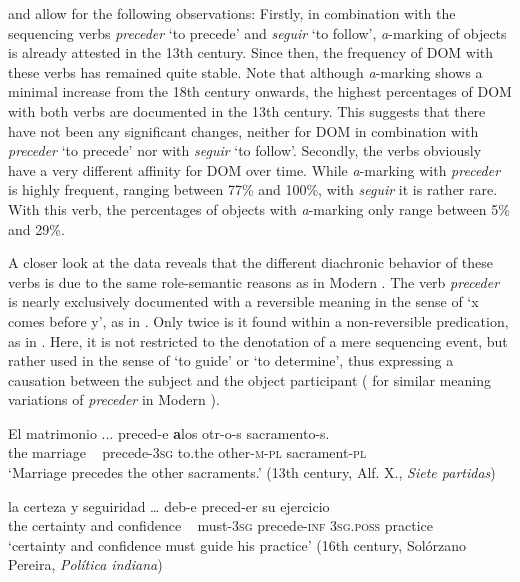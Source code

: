 \documentclass[output=paper]{LSP/langsci}
\begin{document}
 and  allow for the following observations: Firstly, in combination with the sequencing verbs \textit{preceder} ‘to precede’ and \textit{seguir} ‘to follow’, \textit{a}-marking of  objects is already attested in the 13th century. Since then, the frequency of DOM with these verbs has remained quite stable. Note that al\-though \textit{a}-marking shows a minimal increase from the 18th century onwards, the highest percentages of DOM with both verbs are documented in the 13th century. This suggests that there have not been any significant changes, neither for DOM in combination with \textit{preceder} ‘to precede’ nor with \textit{seguir} ‘to follow’. Secondly, the verbs obviously have a very different affinity for DOM over time. While \textit{a}-marking with \textit{preceder} is highly frequent, ranging between 77\% and 100\%, with \textit{seguir} it is rather rare. With this verb, the percentages of  objects with \textit{a}-marking only range between 5\% and 29\%.

A closer look at the data reveals that the different diachronic behavior of these verbs is due to the same role-semantic reasons as in Modern . The verb \textit{preceder} is nearly exclusively documented with a reversible meaning in the sense of ‘x comes before y’, as in . Only twice is it found within a non-reversible predication, as in . Here, it is not restricted to the denotation of a mere sequencing event, but rather used in the sense of ‘to guide’ or ‘to determine’, thus expressing a causation between the subject and the object participant (\cf \citealt[92--93]{Delbecque2002Construction} for similar meaning variations of \textit{preceder} in Modern ).

\begin{exe}
\ex \label{08-ga-ex:22}%
\ea \label{08-ga-ex:22a}
\gll El matrimonio {\ob}...{\cb} preced-e \textbf{a}los otr-o-s sacramento-s.\\
 the marriage ~ precede-3\textsc{sg} to.the other-\textsc{m-pl} sacrament-\textsc{pl}\\
\glt ‘Marriage precedes the other sacraments.’
 (13th century, Alf. X., \textit{Siete partidas})

\ex \label{08-ga-ex:22b}
\gll la certeza y seguiridad {\ob}…{\cb} deb-e preced-er su ejercicio\\
 the certainty and confidence ~ must-3\textsc{sg} precede-\textsc{inf} 3\textsc{sg.poss} practice\\
\glt ‘certainty and confidence must guide his practice’
 (16th century, Solórzano Pereira, \textit{Política indiana})
\z
\end{exe}
\end{document}
